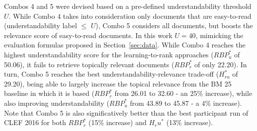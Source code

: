 Combos 4 and 5 were devised based on a pre-defined understandability threshold $U$. While Combo 4 takes into consideration only documents that are easy-to-read (understandability label $\le$ $U$), Combo 5 considers all documents, but boosts the relevance score of easy-to-read documents. In this work $U=40$, mimicking the evaluation formulas proposed in Section~\ref{sec:data}. While Combo 4 reaches the highest understandability score for the learning-to-rank approaches ($RBP_u^{*}$ of 50.06), it fails to retrieve topically relevant documents ($RBP_r^{*}$ of only 22.20). In turn, Combo 5 reaches the best understandability-relevance trade-off ($H_{ru}^{*}$ of 29.20), being able to largely increase the topical relevance from the BM 25 baseline in which it is based ($RBP_r^*$ from 26.01 to 32.60 - an 25\% increase), while also improving understandability ($RBP_u^*$ from 43.89 to 45.87 - a 4\% increase). Note that Combo 5 is also significatively better than the best participant run of CLEF
2016 for both $RBP_r^{*}$ (15\% increase) and $H_ru^{*}$ (13\% increase).




